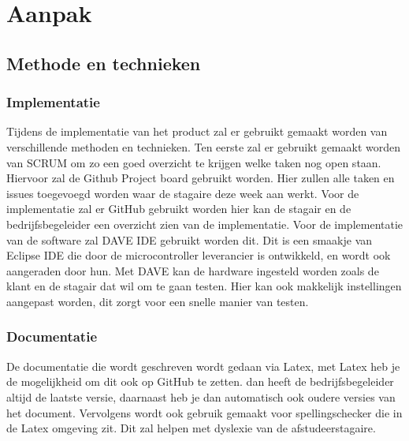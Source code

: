 \chapter{Aanpak}
\section{Methode en technieken}

\subsection{Implementatie}
Tijdens de implementatie van het product zal er gebruikt gemaakt worden van verschillende methoden en technieken. Ten eerste zal er gebruikt gemaakt worden van SCRUM om zo een goed overzicht te krijgen welke taken nog open staan. Hiervoor zal de Github Project board gebruikt worden. Hier zullen alle taken en issues toegevoegd worden waar de stagaire deze week aan werkt. Voor de implementatie zal er GitHub gebruikt worden hier kan de stagair en de bedrijfsbegeleider een overzicht zien van de implementatie. Voor de implementatie van de software zal DAVE IDE gebruikt worden dit. Dit is een smaakje van Eclipse IDE die door de microcontroller leverancier is ontwikkeld, en wordt ook aangeraden door hun. Met DAVE kan de hardware ingesteld worden zoals de klant en de stagair dat wil om te gaan testen. Hier kan ook makkelijk instellingen aangepast worden, dit zorgt voor een snelle manier van testen.

\subsection{Documentatie}
De documentatie die wordt geschreven wordt gedaan via Latex, met Latex heb je de mogelijkheid om dit ook op GitHub te zetten. dan heeft de bedrijfsbegeleider altijd de laatste versie, daarnaast heb je dan automatisch ook oudere versies van het document. Vervolgens wordt ook gebruik gemaakt voor spellingschecker die in de Latex omgeving zit. Dit zal helpen met dyslexie van de afstudeerstagaire.
